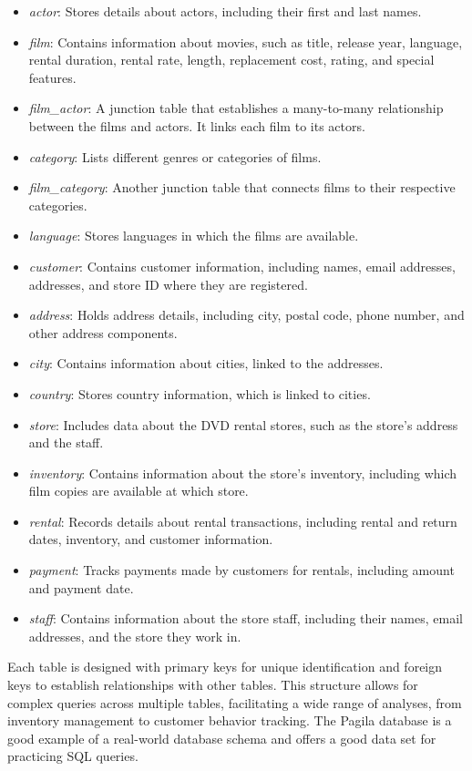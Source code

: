 \begin{withcode}
\begin{itemize}
  \item \emph{actor}: Stores details about actors, including their first and last names.
  \item \emph{film}: Contains information about movies, such as title, release year, language, rental duration, rental rate, length, replacement cost, rating, and special features.
  \item \emph{film\_actor}: A junction table that establishes a many-to-many relationship between the films and actors. It links each film to its actors.
  \item \emph{category}: Lists different genres or categories of films.
  \item \emph{film\_category}: Another junction table that connects films to their respective categories.
  \item \emph{language}: Stores languages in which the films are available.
  \item \emph{customer}: Contains customer information, including names, email addresses, addresses, and store ID where they are registered.
  \item \emph{address}: Holds address details, including city, postal code, phone number, and other address components.
  \item \emph{city}: Contains information about cities, linked to the addresses.
  \item \emph{country}: Stores country information, which is linked to cities.
  \item \emph{store}: Includes data about the DVD rental stores, such as the store's address and the staff.
  \item \emph{inventory}: Contains information about the store's inventory, including which film copies are available at which store.
  \item \emph{rental}: Records details about rental transactions, including rental and return dates, inventory, and customer information.
  \item \emph{payment}: Tracks payments made by customers for rentals, including amount and payment date.
  \item \emph{staff}: Contains information about the store staff, including their names, email addresses, and the store they work in.
\end{itemize}

Each table is designed with primary keys for unique identification and foreign keys to establish relationships with other tables. This structure allows for complex queries across multiple tables, facilitating a wide range of analyses, from inventory management to customer behavior tracking. The Pagila database is a good example of a real-world database schema and offers a good data set for practicing SQL queries.


\end{withcode}
